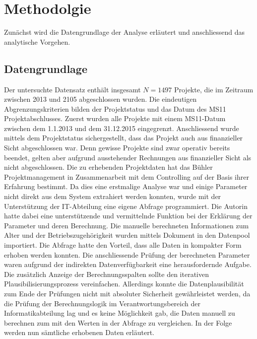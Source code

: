 \chapter{Methodolgie}\label{sec:methode}
Zunächst wird die Datengrundlage der Analyse erläutert und anschliessend das analytische Vorgehen. 
\section{Datengrundlage}\label{sec:datagr}
Der untersuchte Datensatz enthält insgesamt $N = 1497$ Projekte, die im Zeitraum zwischen 2013 und 2105 abgeschlossen wurden. Die eindeutigen Abgrenzungskriterien bilden der Projektstatus und das Datum des MS11 Projektabschlusses. Zuerst wurden alle Projekte mit einem MS11-Datum zwischen dem 1.1.2013 und dem 31.12.2015 eingegrenzt. Anschliessend wurde mittels dem Projektstatus sichergestellt, dass das Projekt auch aus finanzieller Sicht abgeschlossen war. Denn gewisse Projekte sind zwar operativ bereits beendet, gelten aber aufgrund ausstehender Rechnungen aus finanzieller Sicht als \glqq nicht abgeschlossen\grqq. 
\newline\newline
Die zu erhebenden Projektdaten hat das Bühler Projektmanagement in Zusammenarbeit mit dem Controlling auf der Basis ihrer Erfahrung bestimmt. Da dies eine erstmalige Analyse war und einige Parameter nicht direkt aus dem System extrahiert werden konnten, wurde mit der Unterstützung der IT-Abteilung eine eigene Abfrage programmiert. Die Autorin hatte dabei eine unterstützende und vermittelnde Funktion bei der Erklärung der Parameter und deren Berechnung. Die manuelle berechneten Informationen zum Alter und der Betriebszugehörigkeit wurden mittels Dokument in den Datenpool importiert. Die Abfrage hatte den Vorteil, dass alle Daten in kompakter Form erhoben werden konnten. Die anschliessende Prüfung der berechneten Parameter waren aufgrund der indirekten Datenverfügbarkeit eine herausfordernde Aufgabe. Die zusätzlich Anzeige der Berechnungsspalten sollte den iterativen Plausibilisierungsprozess vereinfachen. Allerdings konnte die Datenplausibilität zum Ende der Prüfungen nicht mit absoluter Sicherheit gewährleistet werden, da die Prüfung der Berechnungslogik im Verantwortungsbereich der Informatikabteilung lag und es keine Möglichkeit gab, die Daten manuell zu berechnen zum mit den Werten in der Abfrage zu vergleichen. In der Folge werden nun sämtliche erhobenen Daten erläutert.
